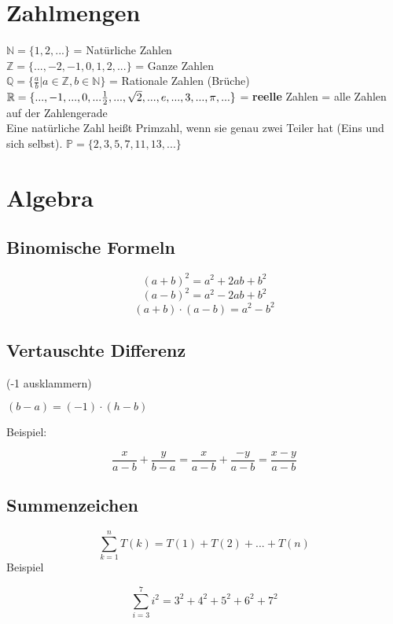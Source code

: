 \arbeitsblattHeader{}
 \begin{multicols}{2}

\section{Zahlmengen}

$\mathbb{N} = \{1,2, ...\}  $ = Natürliche Zahlen\\
$\mathbb{Z} = \{..., -2, -1, 0, 1,2, ...\}  $ = Ganze Zahlen\\
$\mathbb{Q} = \{\frac{a}b | a\in \mathbb{Z}, b\in\mathbb{N}\}$ = Rationale Zahlen (Brüche)\\
$\mathbb{R} = \{..., -1, ..., 0, ... \frac12, ..., \sqrt{2}, ..., e,\\
..., 3, ..., \pi, ...\}  $ = \textbf{reelle} Zahlen = alle Zahlen auf der Zahlengerade\\

Eine natürliche Zahl heißt Primzahl, wenn sie genau zwei Teiler hat (Eins und sich selbst). $\mathbb{P} = \{2, 3, 5, 7, 11, 13, ...\}$

\hrulefill

\section{Algebra}
\subsection{Binomische Formeln}

$$(a+b)^2 = a^2+2ab + b^2$$
$$(a-b)^2=a^2-2ab+b^2$$
$$(a+b)\cdot(a-b) = a^2 - b^2$$

\subsection{Vertauschte Differenz}
(-1 ausklammern)

$(b-a)=(-1)\cdot{}(h-b)$

Beispiel:

$$\frac{x}{a-b} +  \frac{y}{b-a} = \frac{x}{a-b} + \frac{-y}{a-b} = \frac{x-y}{a-b}$$

\subsection{Summenzeichen}
$$\sum_{k=1}^n{T(k)} = T(1) + T(2) + ... + T(n)$$
Beispiel

$$\sum_{i=3}^7{i^2} = 3^2 + 4^2 + 5^2 + 6^2 + 7^2$$


\end{multicols}
